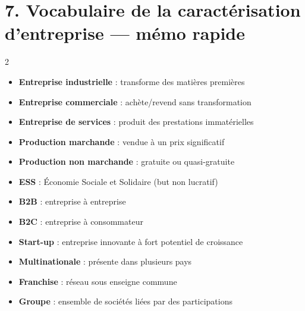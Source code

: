 \documentclass[11pt,a4paper]{article}
\begin{document}
\section*{\textcolor{mainColor}{7. Vocabulaire de la caractérisation d'entreprise — mémo rapide}}

\begin{multicols}{2}
\begin{itemize}
  \item \textbf{Entreprise industrielle} : transforme des matières premières
  \item \textbf{Entreprise commerciale} : achète/revend sans transformation
  \item \textbf{Entreprise de services} : produit des prestations immatérielles
  \item \textbf{Production marchande} : vendue à un prix significatif
  \item \textbf{Production non marchande} : gratuite ou quasi-gratuite
  \item \textbf{ESS} : Économie Sociale et Solidaire (but non lucratif)
  \item \textbf{B2B} : entreprise à entreprise
  \item \textbf{B2C} : entreprise à consommateur
  \item \textbf{Start-up} : entreprise innovante à fort potentiel de croissance
  \item \textbf{Multinationale} : présente dans plusieurs pays
  \item \textbf{Franchise} : réseau sous enseigne commune
  \item \textbf{Groupe} : ensemble de sociétés liées par des participations
\end{itemize}
\end{multicols}
\end{document}
